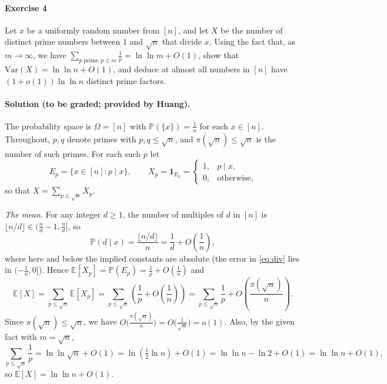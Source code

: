\documentclass[a4paper,12pt]{article}
\newcommand{\mb}[1]{\mathbb{#1}}
\begin{document}
\paragraph{Exercise 4}  Let $x$ be a uniformly random number from $[n]$, and let $X$ be the number of distinct prime numbers between $1$ and $\sqrt{n}$ that divide $x$. Using the fact that, as $m \to \infty$, we have $\sum_{p \; \textrm{prime}, p \le m} \frac{1}{p} = \ln \ln m + O(1)$, show that $\mathrm{Var}(X) = \ln \ln n + O(1)$, and deduce at almost all numbers in $[n]$ have $(1 + o(1)) \ln \ln n$ distinct prime factors.

\paragraph{Solution (to be graded; provided by Huang).} The probability space is $\Omega = [n]$ with $\mb P(\{x\}) = \frac1n$ for each $x \in [n]$. Throughout, $p, q$ denote primes with $p, q \le \sqrt n$, and $\pi(\sqrt n) \le \sqrt n$ is the number of such primes. For each such $p$ let
\[
	E_p = \{ x \in [n] : p \mid x \}, \qquad X_p = \mathbf 1_{E_p} = \begin{cases} 1, & p \mid x, \\ 0, & \text{otherwise}, \end{cases}
\]
so that $X = \sum_{p \le \sqrt n} X_p$.

\emph{The mean.} For any integer $d \ge 1$, the number of multiples of $d$ in $[n]$ is $\lfloor n/d \rfloor \in (\frac nd - 1, \frac nd]$, so
\begin{equation}
	\mb P(d \mid x) = \frac{\lfloor n/d \rfloor}{n} = \frac 1d + O\left( \frac 1n \right), \tag{4} \label{eq:div}
\end{equation}
where here and below the implied constants are absolute (the error in \eqref{eq:div} lies in $(-\frac1n, 0]$). Hence $\mb E[X_p] = \mb P(E_p) = \frac1p + O(\frac1n)$ and
\[
	\mb E[X] = \sum_{p \le \sqrt n} \mb E[X_p] = \sum_{p \le \sqrt n} \left( \frac 1p + O\left( \frac1n \right) \right) = \sum_{p \le \sqrt n} \frac 1p + O\left( \frac{\pi(\sqrt n)}{n} \right).
\]
Since $\pi(\sqrt n) \le \sqrt n$, we have $O\big( \frac{\pi(\sqrt n)}{n} \big) = O\big( \frac{1}{\sqrt n} \big) = o(1)$. Also, by the given fact with $m = \sqrt n$,
\begin{equation}
	\sum_{p \le \sqrt n} \frac 1p = \ln \ln \sqrt n + O(1) = \ln\left( \tfrac12 \ln n \right) + O(1) = \ln \ln n - \ln 2 + O(1) = \ln \ln n + O(1), \tag{5} \label{eq:mertens}
\end{equation}
so $\mb E[X] = \ln \ln n + O(1)$.
\end{document}
